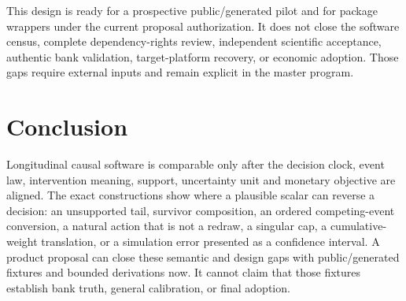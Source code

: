 This design is ready for a prospective public/generated pilot and for package
wrappers under the current proposal authorization. It does not close the
software census, complete dependency-rights review, independent scientific
acceptance, authentic bank validation, target-platform recovery, or economic
adoption. Those gaps require external inputs and remain explicit in the master
program.\citep{exec17_s5_design}

\section{Conclusion}
\label{exec17:s5-end}

Longitudinal causal software is comparable only after the decision clock,
event law, intervention meaning, support, uncertainty unit and monetary
objective are aligned. The exact constructions show where a plausible scalar
can reverse a decision: an unsupported tail, survivor composition, an ordered
competing-event conversion, a natural action that is not a redraw, a singular
cap, a cumulative-weight translation, or a simulation error presented as a
confidence interval. A product proposal can close these semantic and design
gaps with public/generated fixtures and bounded derivations now. It cannot
claim that those fixtures establish bank truth, general calibration, or final
adoption.
